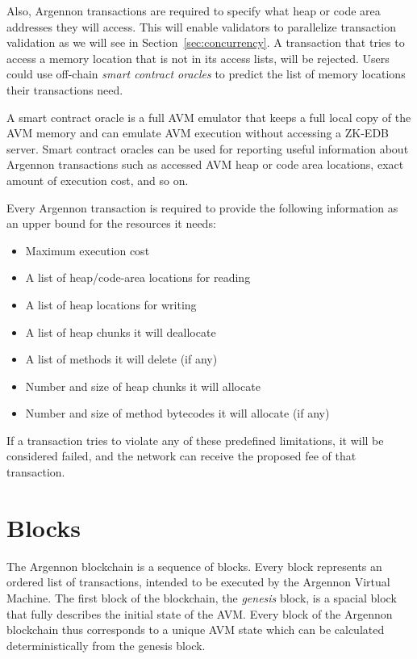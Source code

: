 Also, Argennon transactions are required to specify what heap or code area addresses they will access. This will
enable validators to parallelize transaction validation as we will see in Section~\ref{sec:concurrency}. A transaction
that tries to access a memory location that is not in its access lists, will be rejected.
Users could use off-chain \emph{smart contract oracles} to predict the list of memory locations their transactions need.

A smart contract oracle is a full AVM emulator that keeps a full local copy of the AVM memory and can emulate AVM
execution without accessing a ZK-EDB server. Smart contract oracles can be used for reporting useful information about
Argennon transactions such as accessed AVM heap or code area locations, exact amount of execution cost,
and so on.

Every Argennon transaction is required to provide the following information as an upper bound for the
resources it needs:

\begin{itemize}
    \item Maximum execution cost
    \item A list of heap/code-area locations for reading
    \item A list of heap locations for writing
    \item A list of heap chunks it will deallocate
    \item A list of methods it will delete (if any)
    \item Number and size of heap chunks it will allocate
    \item Number and size of method bytecodes it will allocate (if any)
\end{itemize}

If a transaction tries to violate any of these predefined limitations, it will be considered failed, and the network
can receive the proposed fee of that transaction.



\section{Blocks}\label{sec:blocks}

The Argennon blockchain is a sequence of blocks. Every block represents an ordered list of transactions, intended to be
executed by the Argennon Virtual Machine. The first block of the blockchain, the \emph{genesis} block, is a spacial
block that fully describes the initial state of the AVM. Every block of the Argennon blockchain thus corresponds to a
unique AVM state which can be calculated deterministically from the genesis block.

